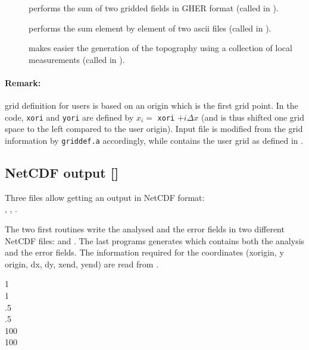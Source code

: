 \begin{description}
\item[] performs the sum of two gridded fields in GHER format (called in ).

\item[] performs the sum element by element of two ascii files (called in ).

\item[] makes easier the generation of the topography using a collection of local measurements (called in ).

\end{description}

\paragraph{Remark:} grid definition for users is based on an origin which is the first grid point. 
In the code, \texttt{xori} and \texttt{yori} are defined by $x_i=$ \texttt{xori} $+i \Delta x$ (and is thus shifted one grid space to the left compared to the user origin). Input file  is modified from the  grid information by \texttt{griddef.a} accordingly, while  contains the user grid as defined in .


\subsection[NetCDF output]{NetCDF output []}


Three files allow getting an output in NetCDF format:\\ 
, , . 

The two first routines write the analysed and the error fields in two different NetCDF files:  and . The last programs generates  which contains both the analysis and the error fields. The information required for the coordinates (xorigin, y origin, dx, dy, xend, yend) are read from .

\begin{exfile}[H]
1\\
1\\
.5\\
 .5\\
100\\
100
\caption{}
\end{exfile}


